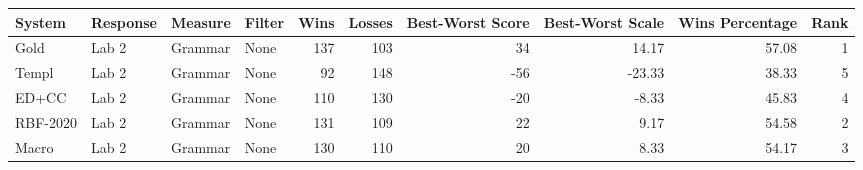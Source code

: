 \begin{tabular}{llllrrrrrr}
\toprule
System & Response & Measure & Filter & Wins & Losses & Best-Worst Score & Best-Worst Scale & Wins Percentage & Rank \\
\midrule
Gold & Lab 2 & Grammar & None & 137 & 103 & 34 & 14.17 & 57.08 & 1 \\
Templ & Lab 2 & Grammar & None & 92 & 148 & -56 & -23.33 & 38.33 & 5 \\
ED+CC & Lab 2 & Grammar & None & 110 & 130 & -20 & -8.33 & 45.83 & 4 \\
RBF-2020 & Lab 2 & Grammar & None & 131 & 109 & 22 & 9.17 & 54.58 & 2 \\
Macro & Lab 2 & Grammar & None & 130 & 110 & 20 & 8.33 & 54.17 & 3 \\
\bottomrule
\end{tabular}
